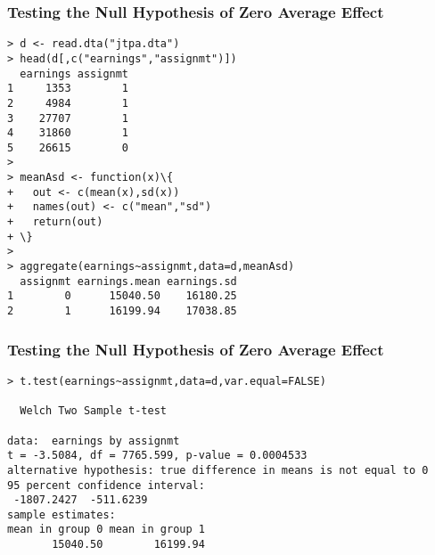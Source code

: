 \documentclass{beamer}
\numberwithin{equation}{section}
\begin{document}
\begin{frame}[fragile]
\frametitle{Testing the Null Hypothesis of Zero Average Effect}
{
\footnotesize
\begin{Verbatim}[frame=single, label=R Code, commandchars=\\\{\}]
> d <- read.dta("jtpa.dta")
> head(d[,c("earnings","assignmt")])
  earnings assignmt
1     1353        1
2     4984        1
3    27707        1
4    31860        1
5    26615        0
> 
> meanAsd <- function(x)\{
+   out <- c(mean(x),sd(x))
+   names(out) <- c("mean","sd")
+   return(out)
+ \}
> 
> aggregate(earnings~assignmt,data=d,meanAsd)
  assignmt earnings.mean earnings.sd
1        0      15040.50    16180.25
2        1      16199.94    17038.85
\end{Verbatim}
}
\end{frame}

\begin{frame}[fragile]
\frametitle{Testing the Null Hypothesis of Zero Average Effect}
{
\footnotesize
\begin{Verbatim}[frame=single, label=R Code, commandchars=\\\{\}]
> t.test(earnings~assignmt,data=d,var.equal=FALSE)

  Welch Two Sample t-test

data:  earnings by assignmt
t = -3.5084, df = 7765.599, p-value = 0.0004533
alternative hypothesis: true difference in means is not equal to 0
95 percent confidence interval:
 -1807.2427  -511.6239
sample estimates:
mean in group 0 mean in group 1 
       15040.50        16199.94 
\end{Verbatim}
}
\end{frame}
\end{document}
